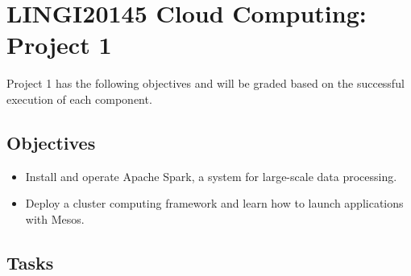 \documentclass[]{article}
\begin{document}
\section{LINGI20145 Cloud Computing: Project 1}

Project 1 has the following objectives and will be graded based on the successful execution of each component.

\subsection{Objectives}

\begin{itemize}
\item Install and operate Apache Spark, a system for large-scale data processing.
\item Deploy a cluster computing framework and learn how to launch applications with Mesos.
\end{itemize}

\subsection{Tasks}
\end{document}
